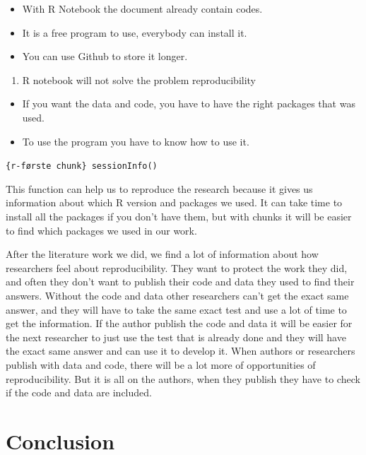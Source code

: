 \documentclass[
  12pt,
  norsk,
]{article}
\providecommand{\tightlist}{%
  \setlength{\itemsep}{0pt}\setlength{\parskip}{0pt}}
\begin{document}
\begin{itemize}
\tightlist
\item
  With R Notebook the document already contain codes.
\item
  It is a free program to use, everybody can install it.
\item
  You can use Github to store it longer.
\end{itemize}

\begin{enumerate}
\def\labelenumi{\arabic{enumi}.}
\setcounter{enumi}{1}
\tightlist
\item
  R notebook will not solve the problem reproducibility
\end{enumerate}

\begin{itemize}
\tightlist
\item
  If you want the data and code, you have to have the right packages
  that was used.\\
\item
  To use the program you have to know how to use it.
\end{itemize}

\texttt{\{r-første\ chunk\}\ sessionInfo()}

This function can help us to reproduce the research because it gives us
information about which R version and packages we used. It can take time
to install all the packages if you don't have them, but with chunks it
will be easier to find which packages we used in our work.

After the literature work we did, we find a lot of information about how
researchers feel about reproducibility. They want to protect the work
they did, and often they don't want to publish their code and data they
used to find their answers. Without the code and data other researchers
can't get the exact same answer, and they will have to take the same
exact test and use a lot of time to get the information. If the author
publish the code and data it will be easier for the next researcher to
just use the test that is already done and they will have the exact same
answer and can use it to develop it. When authors or researchers publish
with data and code, there will be a lot more of opportunities of
reproducibility. But it is all on the authors, when they publish they
have to check if the code and data are included.

\hypertarget{conclusion}{%
\section{Conclusion}\label{conclusion}}
\end{document}
